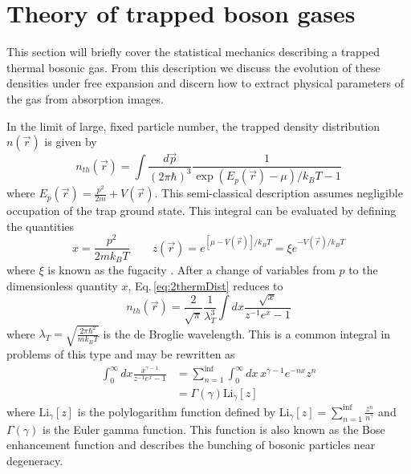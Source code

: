 \section{Theory of trapped boson gases} \label{sec:trapped_gases}
This section will briefly cover the statistical mechanics describing a trapped thermal bosonic gas.
From this description we discuss the evolution of these densities under free expansion and discern how to extract physical parameters of the gas from absorption images.

In the limit of large, fixed particle number, the trapped density distribution $n(\vec{r})$ is given by
\begin{equation} \label{eq:2thermDist}
	n_{th}(\vec{r}) = \int \frac{d\vec{p}}{(2\pi\hbar)^3} \frac{1}{\exp{(E_p(\vec{r}) - \mu)/k_BT} - 1}
\end{equation}
where $E_p(\vec{r}) = \frac{p^2}{2m} + V(\vec{r})$.
This semi-classical description assumes negligible occupation of the trap ground state.
This integral can be evaluated by defining the quantities
\begin{equation*}
	x = \frac{p^2}{2mk_BT} \quad\quad z(\vec{r}) = e^{[\mu - V(\vec{r})]/k_BT} = \xi e^{-V(\vec{r})/k_BT}
\end{equation*}
where $\xi$ is known as the fugacity \cite{psm02}.
After a change of variables from $p$ to the dimensionless quantity $x$, Eq.\,\ref{eq:2thermDist} reduces to
\begin{equation}
	n_{th}(\vec{r}) = \frac{2}{\sqrt{\pi}}\frac{1}{\lambda_T^3}\int dx \frac{\sqrt{x}}{z^{-1}e^x-1}
\end{equation}
where $\lambda_T = \sqrt{\frac{2 \pi \hbar^2}{m k_B T}}$ is the de Broglie wavelength.
This is a common integral in problems of this type and may be rewritten as \cite{Demarco1998, Ketterle1999, psm02}
\begin{equation}
\begin{split}
	\int_0^{\infty}dx\frac{x^{\gamma-1}}{z^{-1}e^x-1} &= \sum_{n=1}^{\inf}\int_0^{\infty}dx \,x^{\gamma-1}e^{-nx}z^n \\
	&=\Gamma(\gamma)\text{Li}_{\gamma}[z]
\end{split}
\end{equation}
where $\text{Li}_{\gamma}[z]$ is the polylogarithm function defined by $\text{Li}_{\gamma}[z] = \sum_{n=1}^{\inf}\frac{z^n}{n^{\gamma}}$ and $\Gamma(\gamma)$ is the Euler gamma function.
This function is also known as the Bose enhancement function \cite{Ketterle1999} and describes the bunching of bosonic particles near degeneracy.
